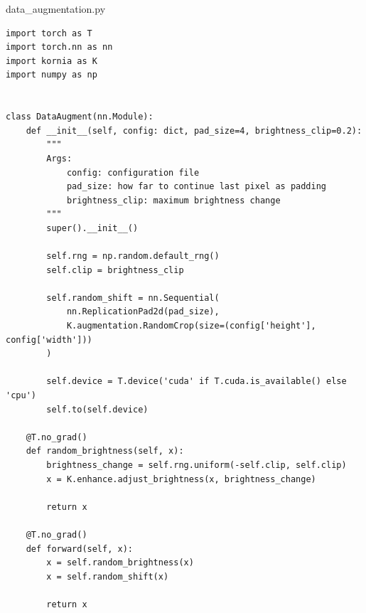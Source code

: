 \documentclass{article}
\begin{document}
data\_augmentation.py
\begin{lstlisting}
import torch as T
import torch.nn as nn
import kornia as K
import numpy as np


class DataAugment(nn.Module):
    def __init__(self, config: dict, pad_size=4, brightness_clip=0.2):
        """
        Args:
            config: configuration file
            pad_size: how far to continue last pixel as padding
            brightness_clip: maximum brightness change
        """
        super().__init__()

        self.rng = np.random.default_rng()
        self.clip = brightness_clip

        self.random_shift = nn.Sequential(
            nn.ReplicationPad2d(pad_size),
            K.augmentation.RandomCrop(size=(config['height'], config['width']))
        )

        self.device = T.device('cuda' if T.cuda.is_available() else 'cpu')
        self.to(self.device)

    @T.no_grad()
    def random_brightness(self, x):
        brightness_change = self.rng.uniform(-self.clip, self.clip)
        x = K.enhance.adjust_brightness(x, brightness_change)

        return x

    @T.no_grad()
    def forward(self, x):
        x = self.random_brightness(x)
        x = self.random_shift(x)

        return x
\end{lstlisting}
\newpage
\end{document}
